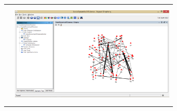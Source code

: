 \begin{table}
\begin{tabular}{cc}
&
\includegraphics[height= 5cm, width=8cm]{project/images/6.png}

\end{tabular}
\end{table}
